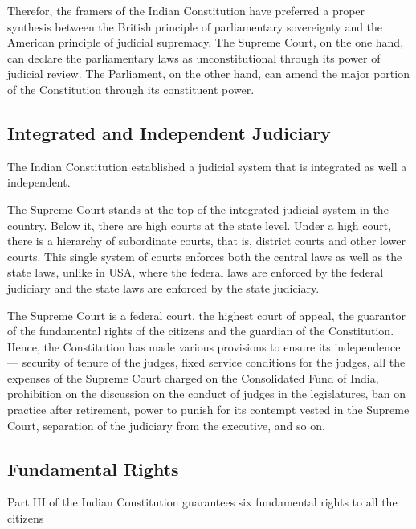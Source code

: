 \begin{multicol}{2}
Therefor, the framers of the Indian Constitution have preferred a proper synthesis between the British principle of parliamentary sovereignty and the American principle of judicial supremacy. The Supreme Court, on the one hand, can declare the parliamentary laws as unconstitutional through its power of judicial review. The Parliament, on the other hand, can amend the major portion of the Constitution through its constituent power.

\subsection{Integrated and Independent Judiciary}

The Indian Constitution established a judicial system that is integrated as well a independent.

The Supreme Court stands at the top of the integrated judicial system in the country. Below it, there are high courts at the state level. Under a high court, there is a hierarchy of subordinate courts, that is, district courts and other lower courts. This single system of courts enforces both the central laws as well as the state laws, unlike in USA, where the federal laws are enforced by the federal judiciary and the state laws are enforced by the state judiciary.

The Supreme Court is a federal court, the highest court of appeal, the guarantor of the fundamental rights of the citizens and the guardian of the Constitution. Hence, the Constitution has made various provisions to ensure its independence — security of tenure of the judges, fixed service conditions for the judges, all the expenses of the Supreme Court charged on the Consolidated Fund of India, prohibition on the discussion on the conduct of judges in the legislatures, ban on practice after retirement, power to punish for its contempt vested in the Supreme Court, separation of the judiciary from the executive, and so on.

\subsection{Fundamental Rights}

Part III of the Indian Constitution guarantees six fundamental rights to all the citizens


\end{multicol}
